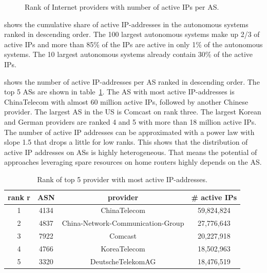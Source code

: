 \begin{figure}[bt]
\begin{minipage}[b]{0.49\textwidth}
  \caption{Rank of Internet providers with number of active IPs per AS.}
  \label{fig:asrank}
\end{minipage}
\end{figure}

 shows the cumulative share of active IP-addresses in the autonomous systems ranked in descending order.
The 100 largest autonomous systems make up 2/3 of active IPs and more than 85\% of the IPs are active in only 1\% of the autonomous systems. The 10 largest autonomous systems already contain 30\% of the active IPs.

 shows the number of active IP-addresses per AS ranked in descending order.
The top 5 ASs are shown in table~\ref{tab:asrank}.
The AS with most active IP-addresses is ChinaTelecom with almost 60 million active IPs, followed by another Chinese provider.
The largest AS in the US is Comcast on rank three.
The largest Korean and German providers are ranked 4 and 5 with more than 18 million active IPs.
The number of active IP addresses can be approximated with a power law with slope 1.5 that drops a little for low ranks.
This shows that the distribution of active IP addresses on ASs is highly heterogeneous.
That means the potential of approaches leveraging spare resources on home routers highly depends on the AS.

\begin{table}[tb]
\centering
\caption{Rank of top 5 provider with most active IP-addresses.}
\label{tab:asrank}
\begin{tabular}{|c|c|c|c|}
\hline
rank r & ASN & provider & \# active IPs  \\
\hline
1 & 4134 & ChinaTelecom & 59,824,824 \\
2 & 4837 & China-Network-Communication-Group & 27,776,643 \\
3 & 7922 & Comcast & 20,227,918 \\
4 & 4766 & KoreaTelecom & 18,502,963 \\
5 & 3320 & DeutscheTelekomAG & 18,476,519 \\
\hline
\end{tabular}
\end{table}
